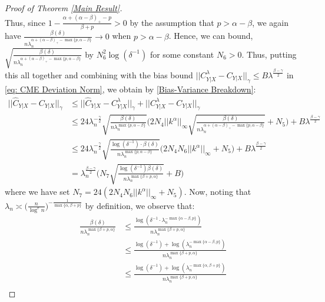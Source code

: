 \documentclass[accepted]{article}
\theoremstyle{definition}
\begin{document}
\begin{proof}[Proof of Theorem \ref{Main Result}]
\begin{equation*}
\end{equation*}
Thus, since $1 - \frac{\alpha + (\alpha - \beta)_{+} - p}{\beta + p} > 0$ by the assumption that $p > \alpha - \beta$, we again have $\frac{\beta(\delta)}{n\lambda_n^{\alpha + (\alpha - \beta)_{+} - \max\{p, \alpha - \beta \}}} \to 0$ when $p > \alpha - \beta$. Hence,  we can bound, $\sqrt{\frac{\beta(\delta)}{n\lambda_n^{\alpha + (\alpha - \beta)_{+} - \max\{p, \alpha - \beta\}}}}$ by $N^2_6 \log (\delta^{-1})$ for some constant $N_6 > 0$.  Thus, putting this all together and combining with the bias bound $||C^{\lambda}_{Y|X} - C_{Y|X}||_{\gamma} \leq B\lambda^{\frac{\beta - \gamma}{2}}$ in \eqref{eq: CME Deviation Norm}, we obtain by \eqref{Bias-Variance Breakdown}:
\begin{align*}
    ||\hat{C}_{Y|X} - C_{Y|X}||_{\gamma} & \leq ||\hat{C}_{Y|X}  - C^{\lambda}_{Y|X}||_{\gamma} + ||C^{\lambda}_{Y|X} - C_{Y | X}||_{\gamma}\\
    & \leq 24\lambda_n^{-\frac{\gamma}{2}}\sqrt{\frac{\beta(\delta)}{n\lambda_n^{\max\{p, \alpha - \beta\}}}} \Big(2N_4||k^{\alpha}||_{\infty}\sqrt{\frac{\beta(\delta)}{n\lambda_n^{\alpha + (\alpha - \beta)_{+} - \max\{p, \alpha - \beta\}}}} + N_5\Big) + B\lambda^{\frac{\beta - \gamma}{2}} \\
    & \leq 24\lambda_n^{-\frac{\gamma}{2}}\sqrt{\frac{\log(\delta^{-1}) \cdot \beta(\delta)}{n\lambda_n^{\max\{p, \alpha - \beta\}}}} \Big(2N_4N_6||k^{\alpha}||_{\infty} + N_5\Big) + B\lambda^{\frac{\beta - \gamma}{2}} \\
    & = \lambda_n^{\frac{\beta - \gamma}{2}}\Big(N_7\sqrt{\frac{\log(\delta^{-1})\beta(\delta)}{n\lambda_n^{\max\{\beta + p, \alpha\}}}} + B\Big)
\end{align*}
where we have set $N_7 = 24(2N_4N_6||k^{\alpha}||_{\infty} + N_5)$. Now, noting that $\lambda_n \asymp \Big(\frac{n}{\log^r n}\Big)^{-\frac{1}{\max\{\alpha, \beta + p\}}}$ by definition, we observe that:
\begin{align}
    \frac{\beta(\delta)}{n\lambda_n^{\max\{\beta + p, \alpha\}}} & \leq \frac{\log (\delta^{-1} \cdot \lambda_n^{-\max\{\alpha - \beta, p\}})}{n\lambda_n^{\max\{\beta + p, \alpha \}}} \nonumber \\
    & \leq \frac{\log (\delta^{-1}) + \log (\lambda_n^{-\max\{\alpha - \beta, p\}})}{n\lambda_n^{\max\{\beta + p, \alpha \}}} \nonumber \\
    & \leq \frac{\log (\delta^{-1}) + \log (\lambda_n^{-\max\{\alpha, \beta + p\}})}{n\lambda_n^{\max\{\beta + p, \alpha \}}} \label{eq: lambda small} \\

\end{align}
\end{proof}
\end{document}
